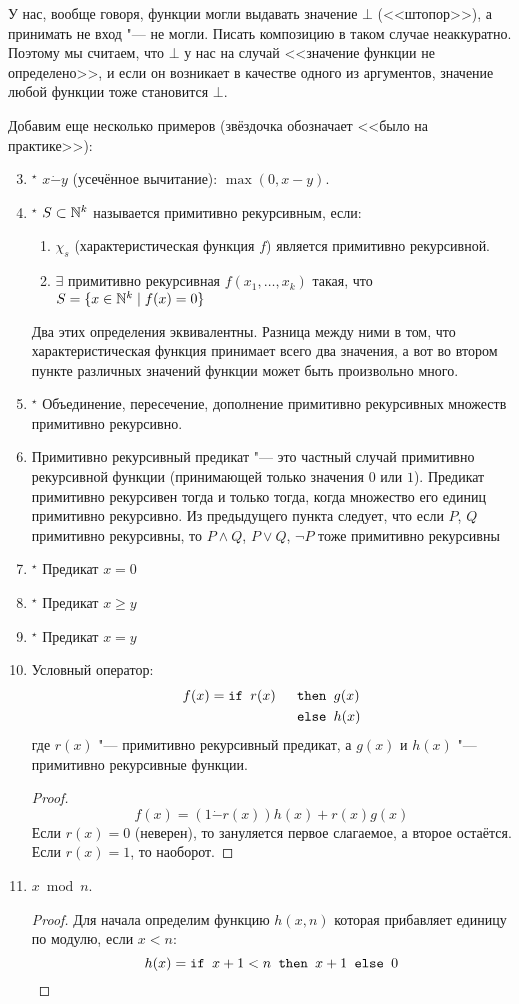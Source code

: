 \begin{Rem}
	У нас, вообще говоря, функции могли выдавать значение $\bot$ (<<штопор>>), а принимать не вход "--- не могли.
	Писать композицию в таком случае неаккуратно.
	Поэтому мы считаем, что $\bot$ у нас на случай <<значение функции не определено>>, и если он возникает в качестве одного из аргументов, значение любой функции тоже становится $\bot$.
\end{Rem}

Добавим еще несколько примеров (звёздочка обозначает <<было на практике>>):
\begin{enumerate}
	\setcounter{enumi}{2}
	\item$^\star$ $x \dot- y$ (усечённое вычитание): $\max(0, x - y)$.
	\item$^\star$ $S \subset \mathbb{N}^k$ называется примитивно рекурсивным, если:
		\begin{enumerate}
		\item $\chi_s$ (характеристическая функция $f$) является примитивно рекурсивной.
		\item $\exists$ примитивно рекурсивная $f(x_1, \dots, x_k)$ такая, что $S = \{ x \in \mathbb{N}^k \mid f(x) = 0\}$
		\end{enumerate}
		Два этих определения эквивалентны.
		Разница между ними в том, что характеристическая функция принимает всего два значения,
		а вот во втором пункте различных значений функции может быть произвольно много.
	\item$^\star$ Объединение, пересечение, дополнение примитивно рекурсивных множеств примитивно рекурсивно.
	\item Примитивно рекурсивный предикат "--- это частный случай примитивно рекурсивной функции (принимающей только значения $0$ или $1$).
		Предикат примитивно рекурсивен тогда и только тогда, когда множество его единиц примитивно рекурсивно.
		Из предыдущего пункта следует, что если $P$, $Q$ примитивно рекурсивны, то $P\land Q$, $P\lor Q$, $\lnot P$
		тоже примитивно рекурсивны
	\item$^\star$ Предикат $x=0$
	\item$^\star$ Предикат $x\ge y$
	\item$^\star$ Предикат $x=y$
	\item Условный оператор:
		\begin{alignat*}{2}
			f(x) &= \texttt{if~} r(x)&\texttt{~then~}&g(x) \\
			     &              &\texttt{~else~}&h(x)
		\end{alignat*}
		где $r(x)$ "--- примитивно рекурсивный предикат, а $g(x)$ и $h(x)$ "--- примитивно рекурсивные функции.
		\begin{proof}
			\[ f(x) = (1 \dot- r(x))h(x) + r(x)g(x) \]
			Если $r(x)=0$ (неверен), то зануляется первое слагаемое, а второе остаётся.
			Если $r(x)=1$, то наоборот.
		\end{proof}
	\item $x \bmod n$.
		\begin{proof}
			Для начала определим функцию $h(x, n)$ которая прибавляет единицу по модулю,
			если $x<n$:
			\[ h(x) = \texttt{if~} x+1 < n \texttt{~then~} x + 1 \texttt{~else~} 0 \]


\end{proof}
\end{enumerate}
